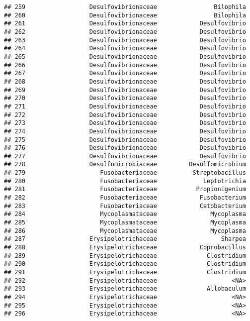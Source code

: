 \documentclass[
]{article}
\begin{document}
\begin{verbatim}
## 259                  Desulfovibrionaceae                Bilophila
## 260                  Desulfovibrionaceae                Bilophila
## 261                  Desulfovibrionaceae            Desulfovibrio
## 262                  Desulfovibrionaceae            Desulfovibrio
## 263                  Desulfovibrionaceae            Desulfovibrio
## 264                  Desulfovibrionaceae            Desulfovibrio
## 265                  Desulfovibrionaceae            Desulfovibrio
## 266                  Desulfovibrionaceae            Desulfovibrio
## 267                  Desulfovibrionaceae            Desulfovibrio
## 268                  Desulfovibrionaceae            Desulfovibrio
## 269                  Desulfovibrionaceae            Desulfovibrio
## 270                  Desulfovibrionaceae            Desulfovibrio
## 271                  Desulfovibrionaceae            Desulfovibrio
## 272                  Desulfovibrionaceae            Desulfovibrio
## 273                  Desulfovibrionaceae            Desulfovibrio
## 274                  Desulfovibrionaceae            Desulfovibrio
## 275                  Desulfovibrionaceae            Desulfovibrio
## 276                  Desulfovibrionaceae            Desulfovibrio
## 277                  Desulfovibrionaceae            Desulfovibrio
## 278                  Desulfomicrobiaceae         Desulfomicrobium
## 279                     Fusobacteriaceae          Streptobacillus
## 280                     Fusobacteriaceae             Leptotrichia
## 281                     Fusobacteriaceae           Propionigenium
## 282                     Fusobacteriaceae            Fusobacterium
## 283                     Fusobacteriaceae            Cetobacterium
## 284                     Mycoplasmataceae               Mycoplasma
## 285                     Mycoplasmataceae               Mycoplasma
## 286                     Mycoplasmataceae               Mycoplasma
## 287                  Erysipelotrichaceae                  Sharpea
## 288                  Erysipelotrichaceae            Coprobacillus
## 289                  Erysipelotrichaceae              Clostridium
## 290                  Erysipelotrichaceae              Clostridium
## 291                  Erysipelotrichaceae              Clostridium
## 292                  Erysipelotrichaceae                     <NA>
## 293                  Erysipelotrichaceae              Allobaculum
## 294                  Erysipelotrichaceae                     <NA>
## 295                  Erysipelotrichaceae                     <NA>
## 296                  Erysipelotrichaceae                     <NA>

\end{verbatim}
\end{document}
